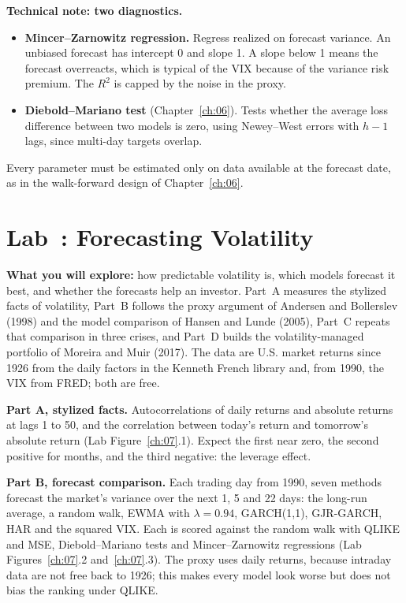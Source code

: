 \begin{technote}
\textbf{Technical note: two diagnostics.}
\begin{itemize}
  \item \textbf{Mincer--Zarnowitz regression.} Regress realized on forecast variance. An unbiased forecast has intercept 0 and slope 1. A slope below 1 means the forecast overreacts, which is typical of the VIX because of the variance risk premium. The $R^2$ is capped by the noise in the proxy.
  \item \textbf{Diebold--Mariano test} (Chapter~\ref{ch:06}). Tests whether the average loss difference between two models is zero, using Newey--West errors with $h - 1$ lags, since multi-day targets overlap.
\end{itemize}
\end{technote}

Every parameter must be estimated only on data available at the forecast date, as in the walk-forward design of Chapter~\ref{ch:06}.

\section{Lab~\thechapter: Forecasting Volatility}
\label{sec:10-lab}

\textbf{What you will explore:} how predictable volatility is, which models forecast it best, and whether the forecasts help an investor. Part~A measures the stylized facts of volatility, Part~B follows the proxy argument of Andersen and Bollerslev (1998) and the model comparison of Hansen and Lunde (2005), Part~C repeats that comparison in three crises, and Part~D builds the volatility-managed portfolio of Moreira and Muir (2017). The data are U.S. market returns since 1926 from the daily factors in the Kenneth French library and, from 1990, the VIX from FRED; both are free.

\textbf{Part A, stylized facts.} Autocorrelations of daily returns and absolute returns at lags 1 to 50, and the correlation between today's return and tomorrow's absolute return (Lab Figure~\ref{ch:07}.1). Expect the first near zero, the second positive for months, and the third negative: the leverage effect.

\textbf{Part B, forecast comparison.} Each trading day from 1990, seven methods forecast the market's variance over the next 1, 5 and 22 days: the long-run average, a random walk, EWMA with $\lambda = 0.94$, GARCH(1,1), GJR-GARCH, HAR and the squared VIX. Each is scored against the random walk with QLIKE and MSE, Diebold--Mariano tests and Mincer--Zarnowitz regressions (Lab Figures~\ref{ch:07}.2 and~\ref{ch:07}.3). The proxy uses daily returns, because intraday data are not free back to 1926; this makes every model look worse but does not bias the ranking under QLIKE.

